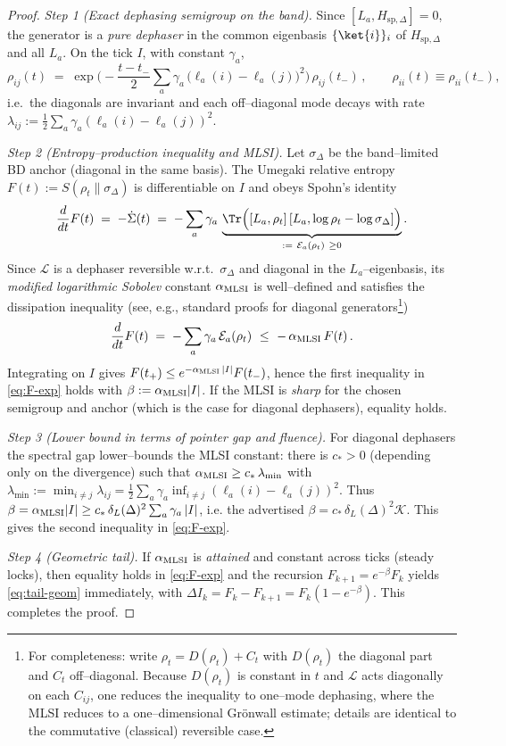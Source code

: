 \documentclass[10pt]{article}
\theoremstyle{definition}
\theoremstyle{plain}
\begin{document}
\begin{proof}
\emph{Step 1 (Exact dephasing semigroup on the band).}
Since $[L_a,H_{\mathrm{sp},\Delta}]=0$, the generator is a \emph{pure dephaser} in the common eigenbasis
$\{\ket{i}\}_{i}$ of $H_{\mathrm{sp},\Delta}$ and all $L_a$. On the tick $I$, with constant $\gamma_a$,
\[
\rho_{ij}(t)\;=\;\exp\!\Big(-\frac{t-t_-}{2}\sum_a \gamma_a\,\big(\ell_a(i)-\ell_a(j)\big)^2\Big)\,\rho_{ij}(t_-)\,,
\qquad \rho_{ii}(t)\equiv \rho_{ii}(t_-),
\]
i.e.\ the diagonals are invariant and each off–diagonal mode decays with rate
$\lambda_{ij}:=\frac12\sum_a \gamma_a(\ell_a(i)-\ell_a(j))^2$.

\emph{Step 2 (Entropy–production inequality and MLSI).}
Let $\sigma_\Delta$ be the band–limited BD anchor (diagonal in the same basis). The Umegaki relative entropy
$F(t):=S(\rho_t\|\sigma_\Delta)$ is differentiable on $I$ and obeys Spohn’s identity
\[
\frac{d}{dt}F(t)\;=\;-\dot{\Sigma}(t)\;=\;-\sum_a \gamma_a\,\underbrace{\Tr\Big([L_a,\rho_t]\,[L_a,\log\rho_t-\log\sigma_\Delta]\Big)}_{:=\ \mathcal E_a(\rho_t)\ \ge 0}.
\]
Since $\mathcal L$ is a dephaser reversible w.r.t.\ $\sigma_\Delta$ and diagonal in the $L_a$–eigenbasis,
its \emph{modified logarithmic Sobolev} constant $\alpha_{\rm MLSI}$ is well–defined and satisfies the
dissipation inequality (see, e.g., standard proofs for diagonal generators\footnote{For completeness:
write $\rho_t=D(\rho_t)+C_t$ with $D(\rho_t)$ the diagonal part and $C_t$ off–diagonal. Because
$D(\rho_t)$ is constant in $t$ and $\mathcal L$ acts diagonally on each $C_{ij}$, one reduces the
inequality to one–mode dephasing, where the MLSI reduces to a one–dimensional Grönwall estimate; details
are identical to the commutative (classical) reversible case.})
\[
\frac{d}{dt}F(t)\;=\;-\sum_a \gamma_a\,\mathcal E_a(\rho_t)\ \le\ -\,\alpha_{\rm MLSI}\,F(t)\,.
\]
Integrating on $I$ gives $F(t_+)\le e^{-\alpha_{\rm MLSI}\,|I|}F(t_-)$, hence the first inequality in
\eqref{eq:F-exp} holds with $\beta:=\alpha_{\rm MLSI}|I|$. If the MLSI is \emph{sharp} for the chosen
semigroup and anchor (which is the case for diagonal dephasers), equality holds.

\emph{Step 3 (Lower bound in terms of pointer gap and fluence).}
For diagonal dephasers the spectral gap lower–bounds the MLSI constant: there is $c_\ast>0$ (depending only
on the divergence) such that $\alpha_{\rm MLSI}\ge c_\ast\,\lambda_{\min}$ with
$\lambda_{\min}:=\min_{i\ne j}\lambda_{ij}=\frac12\sum_a \gamma_a\inf_{i\ne j}(\ell_a(i)-\ell_a(j))^2$.
Thus $\beta=\alpha_{\rm MLSI}|I|\ge c_\ast\,\delta_L(\Delta)^2 \sum_a\gamma_a\,|I|$, i.e. the advertised
$\beta=c_\ast\,\delta_L(\Delta)^2\mathcal K$. This gives the second inequality in \eqref{eq:F-exp}.

\emph{Step 4 (Geometric tail).}
If $\alpha_{\rm MLSI}$ is \emph{attained} and constant across ticks (steady locks), then equality holds in
\eqref{eq:F-exp} and the recursion $F_{k+1}=e^{-\beta}F_k$ yields \eqref{eq:tail-geom} immediately, with
$\Delta I_k=F_k-F_{k+1}=F_k(1-e^{-\beta})$. This completes the proof.
\end{proof}
\end{document}
